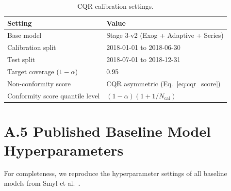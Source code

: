 \begin{table}[H]
\centering
\caption{CQR calibration settings.}
\label{tab:cqr_hparams}
\begin{tabular}{ll}
\toprule
\textbf{Setting} & \textbf{Value} \\
\midrule
Base model         & Stage 3-v2 (Exog + Adaptive + Series) \\
Calibration split  & 2018-01-01 to 2018-06-30 \\
Test split         & 2018-07-01 to 2018-12-31 \\
Target coverage ($1-\alpha$) & 0.95 \\
Non-conformity score & CQR asymmetric (Eq.~\ref{eq:cqr_score}) \\
Conformity score quantile level & $(1-\alpha)(1 + 1/N_{\text{cal}})$ \\
\bottomrule
\end{tabular}
\end{table}

\section*{A.5 Published Baseline Model Hyperparameters}

For completeness, we reproduce the hyperparameter settings of all
baseline models from Smyl et al.~\cite{smyl2025anyquantile}.

